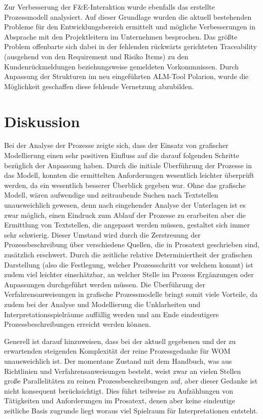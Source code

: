 \documentclass[a4paper,12pt]{report}
\begin{document}
Zur Verbesserung der F\&E-Interaktion wurde ebenfalls das erstellte Prozessmodell analysiert. Auf dieser Grundlage wurden die aktuell bestehenden Probleme für den Entwicklungsbereich ermittelt und mögliche Verbesserungen in Absprache mit den Projektleitern im Unternehmen besprochen. Das größte Problem offenbarte sich dabei in der fehlenden rückwärts gerichteten Traceability (ausgehend von den Requirement und Risiko Items) zu den Kundenrückmeldungen beziehungsweise gemeldeten Vorkommnissen. Durch Anpassung der Strukturen im neu eingeführten ALM-Tool Polarion, wurde die Möglichkeit geschaffen diese fehlende Vernetzung abzubilden.

\section{Diskussion}\label{section:Diskussion}
Bei der Analyse der Prozesse zeigte sich, dass der Einsatz von grafischer Modellierung einen sehr positiven Einfluss auf die darauf folgenden Schritte bezüglich der Anpassung haben. Durch die initiale Überführung der Prozesse in das Modell, konnten die ermittelten Anforderungen wesentlich leichter überprüft werden, da ein wesentlich besserer Überblick gegeben war. Ohne das grafische Modell, wären aufwendige und zeitraubende Suchen nach Textstellen unausweichlich gewesen, denn nach eingehender Analyse der Unterlagen ist es zwar möglich, einen Eindruck zum Ablauf der Prozesse zu erarbeiten aber die Ermittlung von Textstellen, die angepasst werden müssen, gestaltet sich immer sehr schwierig. Dieser Umstand wird durch die Zerstreuung der Prozessbeschreibung über verschiedene Quellen, die in Prosatext geschrieben sind, zusätzlich erschwert. Durch die zeitliche relative Determiniertheit der grafischen Darstellung (also die Festlegung, welcher Prozessschritt vor welchem kommt) ist zudem viel leichter einschätzbar, an welcher Stelle im Prozess Ergänzungen oder Anpassungen durchgeführt werden müssen. Die Überführung der Verfahrensanweisungen in grafische Prozessmodelle bringt somit viele Vorteile, da zudem bei der Analyse und Modellierung die Unklarheiten und Interpretationsspielräume auffällig werden und am Ende eindeutigere Prozessbeschreibungen erreicht werden können.

Generell ist darauf hinzuweisen, dass bei der aktuell gegebenen und der zu erwartenden steigenden Komplexität der reine Prozessgedanke für WOM unausweichlich ist. Der momentane Zustand mit dem Handbuch, was aus Richtlinien und Verfahrensanweisungen besteht, weist zwar an vielen Stellen große Parallelitäten zu reinen Prozessbeschreibungen auf, aber dieser Gedanke ist nicht konsequent berücksichtigt. Dies führt teilweise zu Aufzählungen von Tätigkeiten und Anforderungen im Prosatext, denen aber keine eindeutige zeitliche Basis zugrunde liegt woraus viel Spielraum für Interpretationen entsteht.
\end{document}
